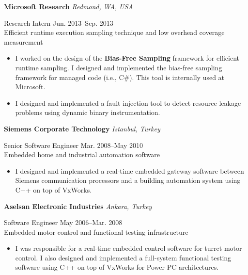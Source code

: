 \documentclass[10pt]{article}
\newcommand{\mysub}[3]{\textbf{#1} {#2} \hfill {\em #3}}
\newcommand{\myssub}[1]{\hspace*{2mm}\parbox{163mm}{#1}\vspace*{2mm}}
\begin{document}
\mysub{Microsoft Research}{}{Redmond, WA, USA} \\
\myssub{\vspace{1mm}Research Intern \hfill Jun. 2013--Sep. 2013\\
Efficient runtime execution sampling technique and low overhead coverage measurement
\vspace{-1mm}
\begin{itemize}
\setlength\itemsep{0em}
\item{I worked on the design of the \textbf{Bias-Free Sampling} framework for efficient runtime sampling. I designed and implemented the bias-free sampling framework for managed code (i.e., C\#). This tool is internally used at Microsoft.}
\item{I designed and implemented a fault injection tool to detect resource leakage problems using dynamic binary instrumentation. }
\end{itemize}
\vspace{-2mm}
}


\mysub{Siemens Corporate Technology}{}{Istanbul, Turkey} \\
\myssub{\vspace{1mm}Senior Software Engineer \hfill Mar. 2008--May 2010 \\
Embedded home and industrial automation software
\vspace{-1mm}
\begin{itemize}
\setlength\itemsep{0em}
\item{I designed and implemented a real-time embedded gateway software between Siemens communication processors and a building automation system using C++ on top of VxWorks.}
\end{itemize}
}


\mysub{Aselsan Electronic Industries}{}{Ankara, Turkey} \\
\myssub{\vspace{1mm}Software Engineer \hfill May 2006--Mar. 2008 \\
Embedded motor control and functional testing infrastructure
\vspace{-1mm}
\begin{itemize}
\setlength\itemsep{0em}
\item{I was responsible for a real-time embedded control software for turret motor control. I also designed and implemented a full-system functional testing software using C++ on top of VxWorks for Power PC architectures.}
\end{itemize}
}
\end{document}
